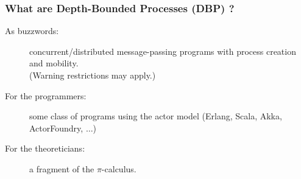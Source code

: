\documentclass{beamer}
\begin{document}
\begin{frame}
  \frametitle{What are Depth-Bounded Processes (DBP) ?}

  \begin{description}
  \item[As buzzwords:]
  concurrent/distributed message-passing programs with process creation and mobility.\\
  (Warning restrictions may apply.)
  \item[For the programmers:] some class of programs using the actor model (Erlang, Scala, Akka, ActorFoundry, $\ldots$)
  \item[For the theoreticians:] a fragment of the $\pi$-calculus.
  \end{description}

\end{frame}
\end{document}
